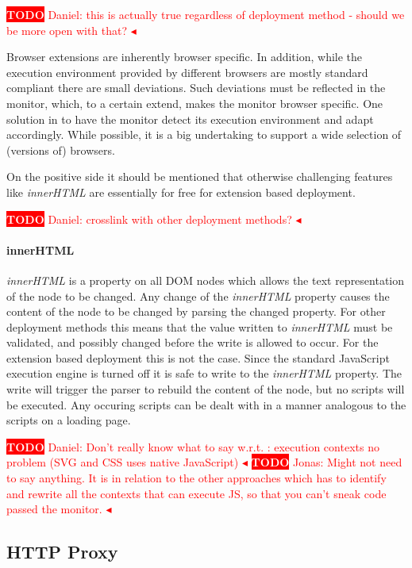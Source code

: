 \documentclass{llncs}
\newcommand{\todo}[1]{\colorbox{red}{\textcolor{white}{\sffamily\bfseries\scriptsize TODO}} \textcolor{red}{#1} \textcolor{red}{$\blacktriangleleft$}}
\begin{document}
\todo{Daniel: this is actually true regardless of deployment method - should we be more open with that?}

Browser extensions are inherently browser specific. In addition, while the
execution environment provided by different browsers are mostly standard
compliant there are small deviations. Such deviations must be reflected in 
the monitor, which, to a certain extend, makes the monitor browser specific.
One solution in to have the monitor detect its execution environment
and adapt accordingly. While possible, it is a big undertaking to support
a wide selection of (versions of) browsers.


On the positive side it should be mentioned that otherwise challenging features
like \emph{innerHTML} are essentially for free for extension based deployment.

\todo{Daniel: crosslink with other deployment methods?} \paragraph{innerHTML}
%
\emph{innerHTML} is a property on all DOM nodes which allows the text
representation of the node to be changed. Any change of the \emph{innerHTML}
property causes the content of the node to be changed by parsing the changed
property. For other deployment methods this means that the value written to
\emph{innerHTML} must be validated, and possibly changed before the write is
allowed to occur.  For the extension based deployment this is not the case.
Since the standard JavaScript execution engine is turned off it is safe to
write to the \emph{innerHTML} property. The write will trigger the parser to
rebuild the content of the node, but no scripts will be executed.  Any occuring
scripts can be dealt with in a manner analogous to the scripts on a loading
page.

\todo{Daniel: Don't really know what to say w.r.t. : execution contexts no problem (SVG and CSS uses native JavaScript)}
\todo{Jonas: Might not need to say anything. It is in relation to the other approaches which has to identify and rewrite all the contexts that can execute JS, so that you can't sneak code passed the monitor.}


\subsection{HTTP Proxy}
\end{document}
